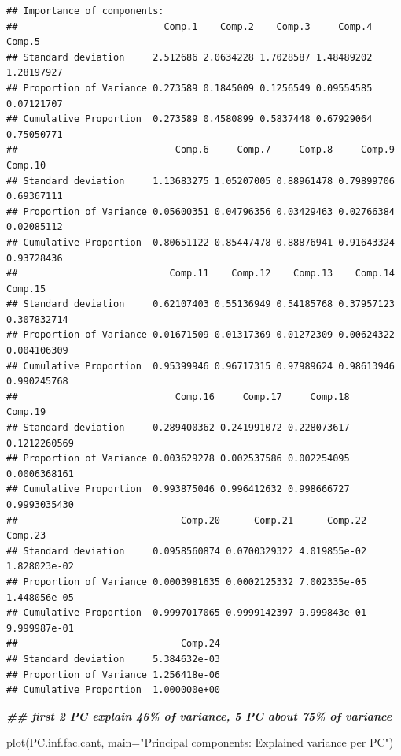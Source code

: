 \documentclass[
]{article}
\newenvironment{Shaded}{\begin{snugshade}}{\end{snugshade}}
\newcommand{\AttributeTok}[1]{\textcolor[rgb]{0.77,0.63,0.00}{#1}}
\newcommand{\DocumentationTok}[1]{\textcolor[rgb]{0.56,0.35,0.01}{\textbf{\textit{#1}}}}
\newcommand{\FunctionTok}[1]{\textcolor[rgb]{0.00,0.00,0.00}{#1}}
\newcommand{\NormalTok}[1]{#1}
\newcommand{\StringTok}[1]{\textcolor[rgb]{0.31,0.60,0.02}{#1}}
\begin{document}
\begin{verbatim}
## Importance of components:
##                          Comp.1    Comp.2    Comp.3     Comp.4     Comp.5
## Standard deviation     2.512686 2.0634228 1.7028587 1.48489202 1.28197927
## Proportion of Variance 0.273589 0.1845009 0.1256549 0.09554585 0.07121707
## Cumulative Proportion  0.273589 0.4580899 0.5837448 0.67929064 0.75050771
##                            Comp.6     Comp.7     Comp.8     Comp.9    Comp.10
## Standard deviation     1.13683275 1.05207005 0.88961478 0.79899706 0.69367111
## Proportion of Variance 0.05600351 0.04796356 0.03429463 0.02766384 0.02085112
## Cumulative Proportion  0.80651122 0.85447478 0.88876941 0.91643324 0.93728436
##                           Comp.11    Comp.12    Comp.13    Comp.14     Comp.15
## Standard deviation     0.62107403 0.55136949 0.54185768 0.37957123 0.307832714
## Proportion of Variance 0.01671509 0.01317369 0.01272309 0.00624322 0.004106309
## Cumulative Proportion  0.95399946 0.96717315 0.97989624 0.98613946 0.990245768
##                            Comp.16     Comp.17     Comp.18      Comp.19
## Standard deviation     0.289400362 0.241991072 0.228073617 0.1212260569
## Proportion of Variance 0.003629278 0.002537586 0.002254095 0.0006368161
## Cumulative Proportion  0.993875046 0.996412632 0.998666727 0.9993035430
##                             Comp.20      Comp.21      Comp.22      Comp.23
## Standard deviation     0.0958560874 0.0700329322 4.019855e-02 1.828023e-02
## Proportion of Variance 0.0003981635 0.0002125332 7.002335e-05 1.448056e-05
## Cumulative Proportion  0.9997017065 0.9999142397 9.999843e-01 9.999987e-01
##                             Comp.24
## Standard deviation     5.384632e-03
## Proportion of Variance 1.256418e-06
## Cumulative Proportion  1.000000e+00
\end{verbatim}

\begin{Shaded}
\begin{Highlighting}[]
\DocumentationTok{\#\# first 2 PC explain 46\% of variance, 5 PC about 75\% of variance}

\FunctionTok{plot}\NormalTok{(PC.inf.fac.cant, }\AttributeTok{main=}\StringTok{"Principal components: Explained variance per PC"}\NormalTok{)}
\end{Highlighting}
\end{Shaded}
\end{document}
